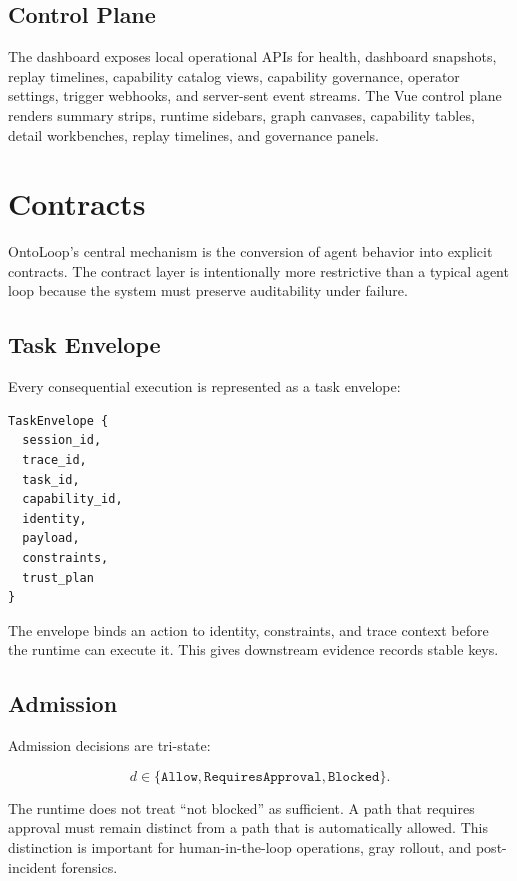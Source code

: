 \documentclass[11pt]{article}
\begin{document}
\subsection{Control Plane}

The dashboard exposes local operational APIs for health, dashboard snapshots,
replay timelines, capability catalog views, capability governance, operator
settings, trigger webhooks, and server-sent event streams. The Vue control plane
renders summary strips, runtime sidebars, graph canvases, capability tables,
detail workbenches, replay timelines, and governance panels.

\section{Contracts}

OntoLoop's central mechanism is the conversion of agent behavior into explicit
contracts. The contract layer is intentionally more restrictive than a typical
agent loop because the system must preserve auditability under failure.

\subsection{Task Envelope}

Every consequential execution is represented as a task envelope:

\begin{verbatim}
TaskEnvelope {
  session_id,
  trace_id,
  task_id,
  capability_id,
  identity,
  payload,
  constraints,
  trust_plan
}
\end{verbatim}

The envelope binds an action to identity, constraints, and trace context before
the runtime can execute it. This gives downstream evidence records stable keys.

\subsection{Admission}

Admission decisions are tri-state:

\[
  d \in \{\texttt{Allow}, \texttt{RequiresApproval}, \texttt{Blocked}\}.
\]

The runtime does not treat ``not blocked'' as sufficient. A path that requires
approval must remain distinct from a path that is automatically allowed. This
distinction is important for human-in-the-loop operations, gray rollout, and
post-incident forensics.
\end{document}
